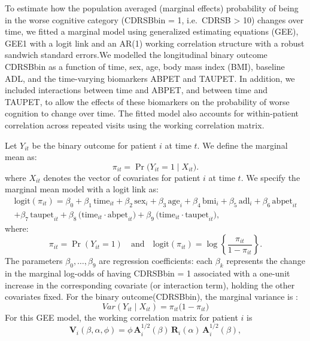 \documentclass[
  11pt,
  letterpaper,
  DIV=11,
  numbers=noendperiod]{scrartcl}
\begin{document}
To estimate how the population averaged (marginal effects) probability
of being in the worse cognitive category (CDRSBbin = 1, i.e.~CDRSB
\textgreater{} 10) changes over time, we fitted a marginal model using
generalized estimating equations (GEE), GEE1 with a logit link and an
AR(1) working correlation structure with a robust sandwich standard
errors.We modelled the longitudinal binary outcome CDRSBbin as a
function of time, sex, age, body mass index (BMI), baseline ADL, and the
time-varying biomarkers ABPET and TAUPET. In addition, we included
interactions between time and ABPET, and between time and TAUPET, to
allow the effects of these biomarkers on the probability of worse
cognition to change over time. The fitted model also accounts for
within-patient correlation across repeated visits using the working
correlation matrix.

Let \(Y_{it}\) be the binary outcome for patient \(i\) at time \(t\). We
define the marginal mean as: \[
\pi_{it} = \Pr\bigl(Y_{it} = 1 \mid X_{it}\bigr).
\] where \(X_{it}\) denotes the vector of covariates for patient \(i\)
at time \(t\). We specify the marginal mean model with a logit link as:
\[
\begin{aligned}
\text{logit}(\pi_{it}) 
=
\beta_0 
+ \beta_1\,\text{time}_{it}
+ \beta_2\,\text{sex}_i
+ \beta_3\,\text{age}_i
+ \beta_4\,\text{bmi}_i
+ \beta_5\,\text{adl}_i
+ \beta_6\,\text{abpet}_{it} \\
+ \beta_7\,\text{taupet}_{it}
+ \beta_8\,\bigl(\text{time}_{it}\cdot \text{abpet}_{it}\bigr)
+ \beta_9\,\bigl(\text{time}_{it}\cdot \text{taupet}_{it}\bigr),
\end{aligned}
\] where: \[
\pi_{it} = \Pr(Y_{it} = 1)
\quad \text{and} \quad
\text{logit}(\pi_{it}) = \log\left\{\frac{\pi_{it}}{1 - \pi_{it}}\right\}.
\] The parameters \(\beta_0,\dots,\beta_9\) are regression coefficients:
each \(\beta_k\) represents the change in the marginal log-odds of
having CDRSBbin = 1 associated with a one-unit increase in the
corresponding covariate (or interaction term), holding the other
covariates fixed. For the binary outcome(CDRSBbin), the marginal
variance is : \[
{Var}(Y_{it} \mid X_{it}) = \pi_{it}\bigl(1 - \pi_{it}\bigr) 
\] For this GEE model, the working correlation matrix for patient \(i\)
is \[
\mathbf{V}_i(\beta, \alpha, \phi)
=
\phi\,\mathbf{A}_i^{1/2}(\beta)\,
\mathbf{R}_i(\alpha)\,
\mathbf{A}_i^{1/2}(\beta),
\]
\end{document}

